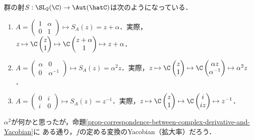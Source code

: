 \documentclass[uplatex, dvipdfmx]{jsreport}
\begin{document}
\begin{example}[並行，回転・拡大，反転変換]\label{exp-basis-of-auto-hatC}
    群の射$S:\SL_2(\C)\to\Aut(\hatC)$は次のようになっている．
    \begin{enumerate}
        \item $A=\begin{pmatrix}1&\alpha\\0&1\end{pmatrix}\mapsto S_A(z)=z+\alpha$．実際，$z\mapsto\C\begin{pmatrix}z\\1\end{pmatrix}\mapsto\C\begin{pmatrix}z+\alpha\\1\end{pmatrix}\mapsto z+\alpha$．
        \item $A=\begin{pmatrix}\alpha&0\\0&\alpha^{-1}\end{pmatrix}\mapsto S_A(z)=\alpha^2z$．実際，$z\mapsto\C\begin{pmatrix}z\\1\end{pmatrix}\mapsto\C\begin{pmatrix}\alpha z\\\alpha^{-1}\end{pmatrix}\mapsto\alpha^2z$．
        \item $A=\begin{pmatrix}0&i\\i&0\end{pmatrix}\mapsto S_A(z)=z^{-1}$．実際，$z\mapsto\C\begin{pmatrix}z\\1\end{pmatrix}\mapsto\C\begin{pmatrix}i\\iz\end{pmatrix}\mapsto z^{-1}$．
    \end{enumerate}
\end{example}
\begin{remark}
    $\alpha^2$が何かと思ったが，命題\ref{prop-correspondence-between-complex-derivative-and-Yacobian}に
    ある通り，$f$の定める変換のYacobian（拡大率）だろう．
\end{remark}
\end{document}
